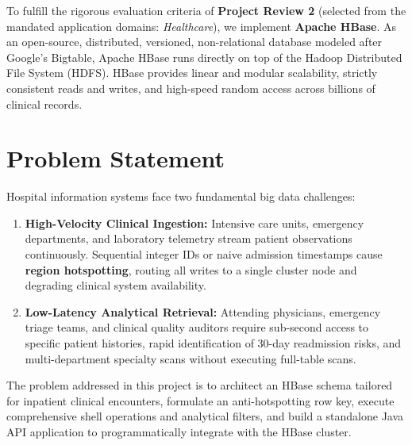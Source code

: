 \documentclass[12pt, a4paper]{article}
\begin{document}
To fulfill the rigorous evaluation criteria of \textbf{Project Review 2} (selected from the mandated application domains: \textit{Healthcare}), we implement \textbf{Apache HBase}. As an open-source, distributed, versioned, non-relational database modeled after Google's Bigtable, Apache HBase runs directly on top of the Hadoop Distributed File System (HDFS). HBase provides linear and modular scalability, strictly consistent reads and writes, and high-speed random access across billions of clinical records.

\section{Problem Statement}
Hospital information systems face two fundamental big data challenges:
\begin{enumerate}
    \item \textbf{High-Velocity Clinical Ingestion:} Intensive care units, emergency departments, and laboratory telemetry stream patient observations continuously. Sequential integer IDs or naive admission timestamps cause \textbf{region hotspotting}, routing all writes to a single cluster node and degrading clinical system availability.
    \item \textbf{Low-Latency Analytical Retrieval:} Attending physicians, emergency triage teams, and clinical quality auditors require sub-second access to specific patient histories, rapid identification of 30-day readmission risks, and multi-department specialty scans without executing full-table scans.
\end{enumerate}
The problem addressed in this project is to architect an HBase schema tailored for inpatient clinical encounters, formulate an anti-hotspotting row key, execute comprehensive shell operations and analytical filters, and build a standalone Java API application to programmatically integrate with the HBase cluster.
\end{document}
